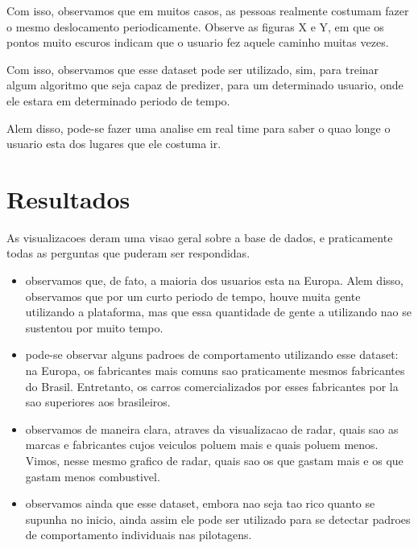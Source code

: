 \documentclass[10pt, conference]{IEEEtran}
\begin{document}
Com isso, observamos que em muitos casos, as pessoas realmente costumam fazer o mesmo deslocamento
periodicamente. Observe as figuras X e Y, em que os pontos muito escuros indicam que o usuario
fez aquele caminho muitas vezes. 

Com isso, observamos que esse dataset pode ser utilizado, sim, para treinar algum algoritmo
que seja capaz de predizer, para um determinado usuario, onde ele estara em determinado periodo 
de tempo.

Alem disso, pode-se fazer uma analise em real time para saber o quao longe o usuario esta dos
lugares que ele costuma ir.






\section{Resultados}
%

As visualizacoes deram uma visao geral sobre a base de dados, e praticamente todas
as perguntas que puderam ser respondidas. 

\begin{itemize}
  
  \item observamos que, de fato, a maioria dos usuarios esta na Europa. Alem disso, observamos
    que por um curto periodo de tempo, houve muita gente utilizando a plataforma, mas que essa
    quantidade de gente a utilizando nao se sustentou por muito tempo.

  \item pode-se observar alguns padroes de comportamento utilizando esse dataset: na Europa, os
    fabricantes mais comuns sao praticamente mesmos fabricantes do Brasil. Entretanto, os carros
    comercializados por esses fabricantes por la sao superiores aos brasileiros.

  \item observamos de maneira clara, atraves da visualizacao de radar, quais sao as marcas
  e fabricantes cujos veiculos poluem mais e quais poluem menos. Vimos, nesse mesmo grafico de radar,  
  quais sao os que gastam mais e os que gastam menos combustivel.

  \item observamos ainda que esse dataset, embora nao seja tao rico quanto se supunha no inicio,
    ainda assim ele pode ser utilizado para se detectar padroes de comportamento individuais 
    nas pilotagens.

\end{itemize}
\end{document}
